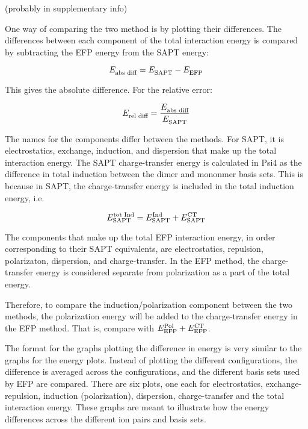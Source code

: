 

\begin{footnotesize}

(probably in supplementary info)

One way of comparing the two method is by plotting their differences.
The differences between each component of the total interaction energy is compared by subtracting the EFP energy from the SAPT energy:

\begin{equation*}
    \energ{abs diff} = \energ{SAPT} - \energ{EFP}
\end{equation*}

This gives the absolute difference. 
For the relative error: 

\begin{equation*}
    \energ{rel diff} = \frac{ \energ{abs diff} } { \energ{SAPT} }
\end{equation*}


The names for the components differ between the methods. 
For SAPT, it is electrostatics, exchange, induction, and dispersion that make up the total interaction energy. 
The SAPT charge-transfer energy is calculated in Psi4 as the difference in total induction between the dimer and mononmer basis sets. 
This is because in SAPT, the charge-transfer energy is included in the total induction energy, i.e.

\begin{equation*}
    \energ[tot Ind]{SAPT} = \energ[Ind]{SAPT} + \energ[CT]{SAPT}
\end{equation*}


The components that make up the total EFP interaction energy, in order corresponding to their SAPT equivalents, are electrostatics, repulsion, polarizaton, dispersion, and charge-transfer. 
In the EFP method, the charge-transfer energy is considered separate from polarization as a part of the total energy. 

Therefore, to compare the induction/polarization component between the two methods, the polarization energy will be added to the charge-transfer energy in the EFP method. 
That is, compare 
 with
$ \energ[Pol]{EFP} + \energ[CT]{EFP} $.


The format for the graphs plotting the difference in energy is very similar to the graphs for the energy plots. 
Instead of plotting the different configurations, the difference is averaged across the configurations, and the different basis sets used by EFP are compared. 
There are six plots, one each for electrostatics, exchange-repulsion, induction (polarization), dispersion, charge-transfer and the total interaction energy.
These graphs are meant to illustrate how the energy differences across the different ion pairs and basis sets.



\end{footnotesize}
